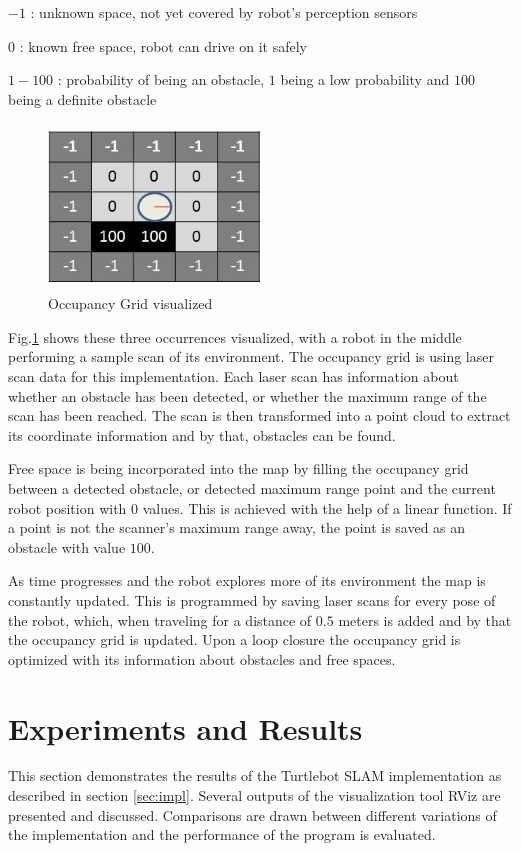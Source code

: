 \documentclass{ba-kecs}
\begin{document}
\begin{description}
\item{$-1$} : unknown space, not yet covered by robot's perception sensors
\item{$ 0$} : known free space, robot can drive on it safely
\item{$1-100$} : probability of being an obstacle, $1$ being a low probability and $100$ being a definite obstacle
\end{description}

\begin{figure}[htbp]
	\centering
		\includegraphics[width=0.50\textwidth,height = 44mm]{figures/Occup.png}
	\caption{Occupancy Grid visualized}
	\label{fig:Occupancy}
\end{figure}

Fig.\ref{fig:Occupancy} shows these three occurrences visualized, with a robot in the middle performing a sample scan of its environment.
The occupancy grid is using laser scan data for this implementation. Each laser scan has information about whether an obstacle has been detected, or whether the maximum range of the scan has been reached. The scan is then transformed into a point cloud to extract its coordinate information and by that, obstacles can be found.

Free space is being incorporated into the map by filling the occupancy grid between a detected obstacle, or detected maximum range point and the current robot position with $0$ values. This is achieved with the help of a linear function. If a point is not the scanner's maximum range away, the point is saved as an obstacle with value $100$.

As time progresses and the robot explores more of its environment the map is constantly updated. This is programmed by saving laser scans for every pose of the robot, which, when traveling for a distance of $0.5$ meters is added and by that the occupancy grid is updated. Upon a loop closure the occupancy grid is optimized with its information about obstacles and free spaces.

\section{Experiments and Results}
\label{sec:exp}
This section demonstrates the results of the Turtlebot SLAM implementation as described in section \ref{sec:impl}. Several outputs of the visualization tool RViz are presented and discussed. Comparisons are drawn between different variations of the implementation and the performance of the program is evaluated.
\end{document}

